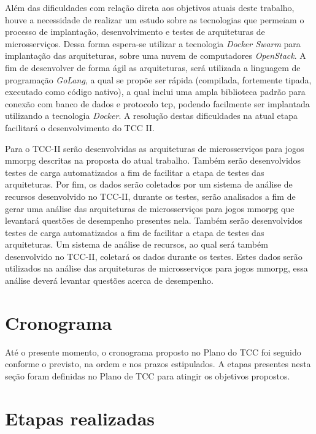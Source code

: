 Além das dificuldades com relação direta aos objetivos atuais deste trabalho, houve a necessidade de realizar um estudo sobre as tecnologias que permeiam o processo de implantação, desenvolvimento e testes de arquiteturas de microsserviços.
%
Dessa forma espera-se utilizar a tecnologia \textit{Docker Swarm} para implantação das arquiteturas, sobre uma nuvem de computadores \textit{OpenStack}.
%
A fim de desenvolver de forma ágil as arquiteturas, será utilizada a linguagem de programação \textit{GoLang}, a qual se propõe ser rápida (compilada, fortemente tipada, executado como código nativo), a qual inclui uma ampla biblioteca padrão para conexão com banco de dados e protocolo \ac{tcp}, podendo facilmente ser implantada utilizando a tecnologia \textit{Docker}.
%
A resolução destas dificuldades na atual etapa facilitará o desenvolvimento do TCC II.

Para o TCC-II serão desenvolvidas as arquiteturas de microsserviços para jogos \ac{mmorpg} descritas na proposta do atual trabalho.
%
Também serão desenvolvidos testes de carga automatizados a fim de facilitar a etapa de testes das arquiteturas.
%
Por fim, os dados serão coletados por um sistema de análise de recursos desenvolvido no TCC-II, durante os testes, serão analisados a fim de gerar uma análise das arquiteturas de microsserviços para jogos \ac{mmorpg} que levantará questões de desempenho presentes nela.
%
Também serão desenvolvidos testes de carga automatizados a fim de facilitar a etapa de testes das arquiteturas.
%
Um sistema de análise de recursos, ao qual será também desenvolvido no TCC-II, coletará os dados durante os testes. Estes dados serão utilizados na análise das arquiteturas de microsserviços para jogos \ac{mmorpg}, essa análise deverá levantar questões acerca de desempenho.


\section{Cronograma}



Até o presente momento, o cronograma proposto no Plano do TCC foi seguido conforme o previsto, na ordem e nos prazos estipulados.
%
A etapas presentes nesta seção foram definidas no Plano de TCC para atingir os objetivos propostos.



\section{Etapas realizadas}



